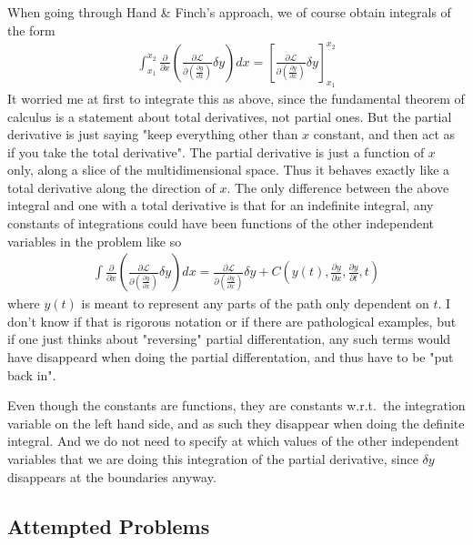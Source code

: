 \documentclass[a4paper]{article}
\begin{document}
    When going through Hand \& Finch's approach, we of course obtain integrals of the form \begin{align*}
        \int_{x_1}^{x_2} \frac{\partial}{\partial x} \left( \frac{\partial \mathcal{L} }{\partial \left( \frac{\partial y}{\partial x}  \right) } \delta y \right)  dx = \left[ \frac{\partial \mathcal{L} }{\partial \left( \frac{\partial y}{\partial x}  \right) } \delta y \right]_{x_1}^{x_2}
    \end{align*}
    It worried me at first to integrate this as above, since the fundamental theorem of calculus is a statement about total derivatives, not partial ones. But the partial derivative is just saying "keep everything other than \(x\) constant, and then act as if you take the total derivative". The partial derivative is just a function of \(x\) only, along a slice of the multidimensional space. Thus it behaves exactly like a total derivative along the direction of \(x\). The only difference between the above integral and one with a total derivative is that for an indefinite integral, any constants of integrations could have been functions of the other independent variables in the problem like so \begin{align*}
        \int \frac{\partial}{\partial x} \left( \frac{\partial \mathcal{L} }{\partial \left( \frac{\partial y}{\partial x}  \right) } \delta y \right)  dx = \frac{\partial \mathcal{L} }{\partial \left( \frac{\partial y}{\partial x}  \right) } \delta y + C\left(y(t), \frac{\partial y}{\partial x}, \frac{\partial y}{\partial t}, t\right)
    \end{align*}
    where \(y(t)\) is meant to represent any parts of the path only dependent on \(t\). I don't know if that is rigorous notation or if there are pathological examples, but if one just thinks about "reversing" partial differentation, any such terms would have disappeard when doing the partial differentation, and thus have to be "put back in". 

    Even though the constants are functions, they are constants w.r.t.\ the integration variable on the left hand side, and as such they disappear when doing the definite integral. And we do not need to specify at which values of the other independent variables that we are doing this integration of the partial derivative, since \(\delta y\) disappears at the boundaries anyway.

    \subsection{Attempted Problems}
\end{document}
